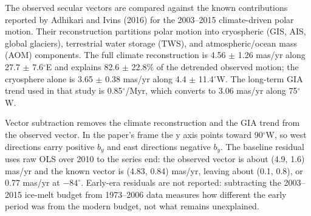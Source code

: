 \documentclass[11pt,a4paper]{article}
\begin{document}
The observed secular vectors are compared against the known contributions reported by Adhikari and Ivins (2016) for the 2003--2015 climate-driven polar motion. Their reconstruction partitions polar motion into cryospheric (GIS, AIS, global glaciers), terrestrial water storage (TWS), and atmospheric/ocean mass (AOM) components. The full climate reconstruction is 4.56 $\pm$ 1.26 mas/yr along 27.7 $\pm$ 7.6$^{\circ}$E and explains 82.6 $\pm$ 22.8\% of the detrended observed motion; the cryosphere alone is 3.65 $\pm$ 0.38 mas/yr along 4.4 $\pm$ 11.4$^{\circ}$W. The long-term GIA trend used in that study is 0.85$^{\circ}$/Myr, which converts to 3.06 mas/yr along 75$^{\circ}$W.

\begin{table}[ht]
\centering
\caption{Known polar-motion contributions used as the subtraction benchmark, from Adhikari and Ivins (2016). Only the terms used in the subtraction are listed; the GIS, AIS and TWS partitions are not independently used here.}
\label{tab:known}
\small
{}
\end{table}

Vector subtraction removes the climate reconstruction and the GIA trend from the observed vector. In the paper's frame the y axis points toward 90$^{\circ}$W, so west directions carry positive $b_y$ and east directions negative $b_y$. The baseline residual uses raw OLS over 2010 to the series end: the observed vector is about (4.9, 1.6) mas/yr and the known vector is (4.83, 0.84) mas/yr, leaving about (0.1, 0.8), or 0.77 mas/yr at $-84^{\circ}$. Early-era residuals are not reported: subtracting the 2003--2015 ice-melt budget from 1973--2006 data measures how different the early period was from the modern budget, not what remains unexplained.
\end{document}
